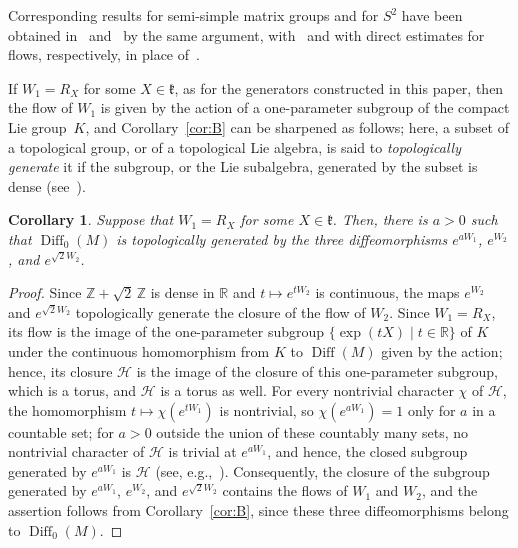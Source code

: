 \documentclass{article}
\newcommand{\R}{\mathbb{R}}
\newcommand{\Z}{\mathbb{Z}}
\newcommand{\frakk}{\mathfrak{k}}
\theoremstyle{definition}
\theoremstyle{plain}
\newtheorem{maincorC}{Corollary}
\begin{document}
Corresponding results for semi-simple matrix groups and for $S^2$ have been obtained in~\cite[Section~4.2]{CofD3gen} and~\cite[Section~4]{CofDS2} by the same argument, with~\cite[Theorem~2.5]{Varolin01} and with direct estimates for flows, respectively, in place of~\cite[Theorem~1]{AK26}.


 If $W_1=R_X$ for some $X\in\frakk$, as for the generators constructed in this paper, then the flow of $W_1$ is given by the action of a one-parameter subgroup of the compact Lie group~$K$, and Corollary~\ref{cor:B} can be sharpened as follows; here, a subset of a topological group, or of a topological Lie algebra, is said to {\it topologically generate} it if the subgroup, or the Lie subalgebra, generated by the subset is dense (see~\cite[pp.~1203--1204]{Luk75Izv}).

\begin{maincorC}\label{cor:three}
Suppose that $W_1=R_X$ for some $X\in\frakk$.
Then, there is $a>0$ such that $\operatorname{Diff}_0(M)$ is topologically generated by the three diffeomorphisms $e^{aW_1}$, $e^{W_2}$, and $e^{\sqrt2W_2}$.
\end{maincorC}

\begin{proof}
Since $\Z+\sqrt2\,\Z$ is dense in $\R$ and $t\mapsto e^{tW_2}$ is continuous, the maps $e^{W_2}$ and $e^{\sqrt2 W_2}$ topologically generate the closure of the flow of $W_2$.
Since $W_1=R_X$, its flow is the image of the one-parameter subgroup $\{\exp(tX) \mid t\in\R\}$ of $K$ under the continuous homomorphism from $K$ to $\operatorname{Diff}(M)$ given by the action; hence, its closure $\mathcal H$ is the image of the closure of this one-parameter subgroup, which is a torus, and $\mathcal H$ is a torus as well.
For every nontrivial character $\chi$ of $\mathcal H$, the homomorphism $t\mapsto\chi(e^{tW_1})$ is nontrivial, so $\chi(e^{aW_1})=1$ only for $a$ in a countable set; for $a>0$ outside the union of these countably many sets, no nontrivial character of $\mathcal H$ is trivial at $e^{aW_1}$, and hence, the closed subgroup generated by $e^{aW_1}$ is $\mathcal H$ (see, e.g.,~\cite[Chapter~III]{BtD}).
Consequently, the closure of the subgroup generated by $e^{aW_1}$, $e^{W_2}$, and $e^{\sqrt2 W_2}$ contains the flows of $W_1$ and $W_2$, and the assertion follows from Corollary~\ref{cor:B}, since these three diffeomorphisms belong to $\operatorname{Diff}_0(M)$.
\end{proof}
\end{document}
